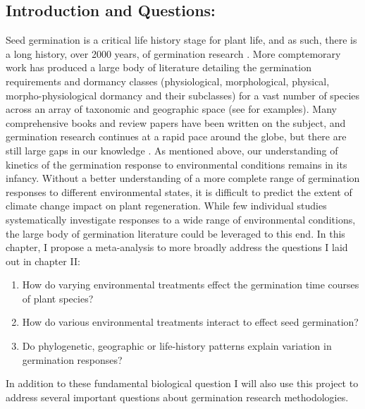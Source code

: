 \documentclass[12pt]{article}\usepackage[]{graphicx}\usepackage[]{color}
\begin{document}
\subsection*{Introduction and Questions:}
\indent\indent Seed germination is a critical life history stage for plant life, and as such, there is a long history, over 2000 years, of germination research \citep{Baskin2014, Fenner2000}. More comptemorary work has produced a large body of literature detailing the germination requirements and dormancy classes (physiological, morphological, physical, morpho-physiological dormancy and their subclasses) for a vast number of species across an array of taxonomic and geographic space (see \citet{Baskin2014} for examples). Many comprehensive books and review papers have been written on the subject, and germination research continues at a rapid pace around the globe, but there are still large gaps in our knowledge \citep{Baskin2014}. As mentioned above, our understanding of  kinetics of the germination response to environmental conditions remains in its infancy. Without a better understanding of a more complete range of germination responses to different environmental states, it is difficult to predict the extent of climate change impact on plant regeneration. While few individual studies systematically investigate responses to a wide range of environmental conditions, the large body of germination literature could be leveraged to this end. In this chapter, I propose a meta-analysis to more broadly address the questions I laid out in chapter II:
\begin{enumerate}
\item How do varying environmental treatments effect the germination time courses of plant species?
\item How do various environmental treatments interact to effect seed germination?
\item Do phylogenetic, geographic or life-history patterns explain variation in germination responses?
\end{enumerate}
\indent\indent In addition to these fundamental biological question I will also use this project to address several important questions about germination research methodologies.
\end{document}
